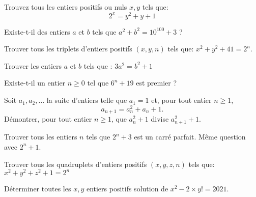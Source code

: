 \smallskip


\begin{exo}
Trouvez tous les entiers positifs ou nuls $x,y$ tels que:
 $$2^x=y^2+y+1$$
\end{exo}


\begin{exo}
Existe-t-il des entiers $a$ et $b$ tels que $a^2 + b^2 = 10^{100} + 3$ ?
\end{exo}


\begin{exo} Trouver tous les triplets d'entiers positifs $(x,y,n)$ tels que:
$x^2+y^2+41=2^n$.
\end{exo}


\begin{exo}
Trouver les entiers $a$ et $b$ tels que : $3a^2=b^2+1$
\end{exo}


\begin{exo}
Existe-t-il un entier $n\geq 0$ tel que $6^n+19$ est premier ?
\end{exo}


\begin{exo}
Soit $a_1,a_2,\ldots$ la suite d'entiers telle que $a_1 = 1$ et,
pour tout entier $n \geqslant 1$,
\[a_{n+1} = a_n^2+a_n+1.\]
Démontrer, pour tout entier $n \geqslant 1$, que
$a_n^2+1$ divise $a_{n+1}^2+1$.
\end{exo}


\begin{exo}
Trouver tous les entiers $n$ tels que $2^n + 3$ est un carré parfait. Même question avec $2^n + 1$.
\end{exo}


\begin{exo} Trouver tous les quadruplets d'entiers positifs $(x,y,z,n)$ tels que: $x^2+y^2+z^2+1=2^n$
\end{exo}


\begin{exo}
Déterminer toutes les $x,y$ entiers positifs solution de $x^2-2\times y!=2021$.
\end{exo}






